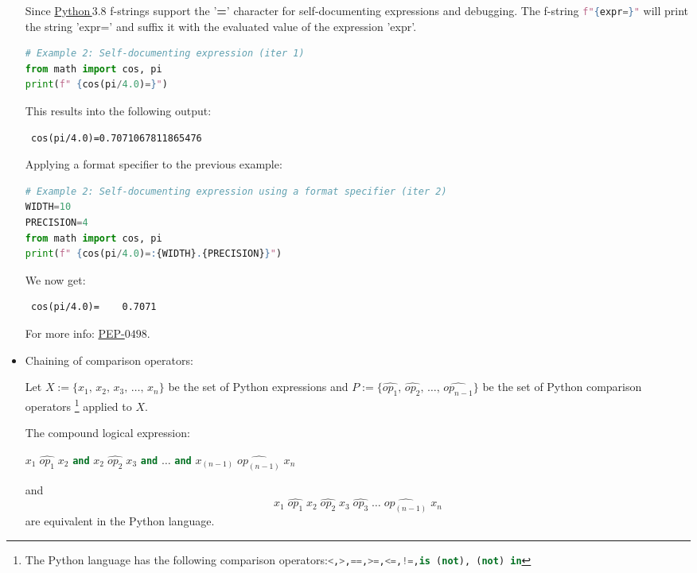 \documentclass[10pt]{article}
\begin{document}
\begin{itemize}
Since \href{https://docs.python.org/3.8/whatsnew/3.8.html}{Python\,$3.8$} f-strings support the '\textbf{=}' character for self-documenting expressions and debugging.
The f-string \lstinline[language=python]|f"{expr=}"| will print the string 'expr=' and suffix it with the evaluated value of the expression 'expr'.

\begin{lstlisting}[language=python]
# Example 2: Self-documenting expression (iter 1)
from math import cos, pi
print(f" {cos(pi/4.0)=}")
\end{lstlisting}

This results into the following output:
\begin{verbatim}
 cos(pi/4.0)=0.7071067811865476
\end{verbatim}

Applying a format specifier to the previous example:
\begin{lstlisting}[language=python]
# Example 2: Self-documenting expression using a format specifier (iter 2)
WIDTH=10
PRECISION=4
from math import cos, pi
print(f" {cos(pi/4.0)=:{WIDTH}.{PRECISION}}")
\end{lstlisting}
We now get:
\begin{verbatim}
 cos(pi/4.0)=    0.7071
\end{verbatim}

For more info: \href{https://www.python.org/dev/peps/pep-0498/}{PEP-$0498$}.

\item Chaining of comparison operators:\newline

Let $X:=\{ x_1,\,x_2,\,x_3,\, \ldots,\,x_n \}$ be the set of Python expressions and $P:=\{ \widehat{op_1}, \,\widehat{op_2}, \, \ldots, \, \widehat{op_{n-1}} \}$
be the set of Python comparison operators \footnote{The Python language has the following comparison operators:\lstinline[language=python]{<,>,==,>=,<=,!=,is (not), (not) in}} applied to $X$.

The compound logical expression:
\begin{center}
$x_1 \; \widehat{op_1} \; x_2$ \lstinline[language=python]{and}
               $x_2 \; \widehat{op_2} \; x_3$ \lstinline[language=python]{and} $ \ldots$  \lstinline[language=python]{and}
$       x_{(n-1)} \; \widehat{op_{(n-1)}} \; x_n $ \newline
\end{center}
and
\begin{equation}
	x_1 \; \widehat{op_1} \; x_2  \; \widehat{op_2} \; x_3  \; \widehat{op_3} \; \ldots \; \widehat{op_{(n-1)}} \; x_n
\end{equation}	
are equivalent in the Python language.


\end{itemize}
\end{document}
